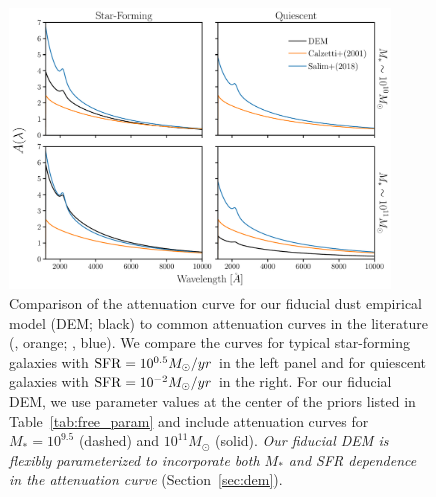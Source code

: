 
\begin{figure}
\begin{center}
    \includegraphics[width=0.9\textwidth]{figs/dems.pdf}
    \caption{Comparison of the attenuation curve for our fiducial dust empirical
    model (DEM; black) to common attenuation curves in the
    literature (\citealt{calzetti2001}, orange; \citealt{salim2018}, blue). We compare the curves for typical 
    star-forming galaxies with ${\rm SFR}=10^{0.5}M_\odot/yr$ in the left panel
    and for quiescent galaxies with ${\rm SFR}=10^{-2}M_\odot/yr$ in the right.
    For our fiducial DEM, we use parameter values at {\color{red} the center of the priors
    listed in Table~\ref{tab:free_param}} and include attenuation curves for $M_* = 10^{9.5}$
    (dashed) and $10^{11} M_\odot$ (solid). {\em Our fiducial DEM is flexibly
    parameterized to incorporate both $M_*$ and SFR dependence in the
    attenuation curve} (Section~\ref{sec:dem}).
    } 
\label{fig:dem}
\end{center}
\end{figure}


